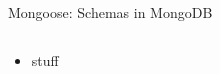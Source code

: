 \begin{frame}{Mongoose: Schemas in MongoDB}
  \begin{columns}[onlytextwidth]
    \begin{column}{0.6\textwidth}
      \begin{itemize}
          \item stuff
      \end{itemize}
    \end{column}
    \begin{column}[t]{0.4\textwidth}
    \end{column}
  \end{columns}
\end{frame}
